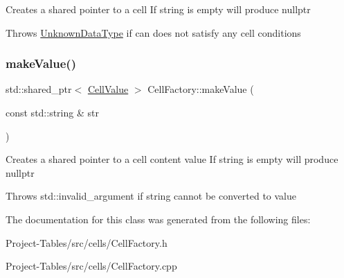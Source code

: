 Creates a shared pointer to a cell If string is empty will produce nullptr

Throws \hyperlink{classUnknownDataType}{Unknown\+Data\+Type} if can does not satisfy any cell conditions \mbox{\label{classCellFactory_af112ed8e49626db7d872db0d75409aa3}} 
\subsubsection{\texorpdfstring{make\+Value()}{makeValue()}}
{\footnotesize\ttfamily std\+::shared\+\_\+ptr$<$ \hyperlink{classCellValue}{Cell\+Value} $>$ Cell\+Factory\+::make\+Value (\begin{DoxyParamCaption}\item[{const std\+::string \&}]{str }\end{DoxyParamCaption})\hspace{0.3cm}{\ttfamily [static]}}

Creates a shared pointer to a cell content value If string is empty will produce nullptr

Throws std\+::invalid\+\_\+argument if string cannot be converted to value 

The documentation for this class was generated from the following files\+:\begin{DoxyCompactItemize}
\item 
Project-\/\+Tables/src/cells/Cell\+Factory.\+h\item 
Project-\/\+Tables/src/cells/Cell\+Factory.\+cpp\end{DoxyCompactItemize}
